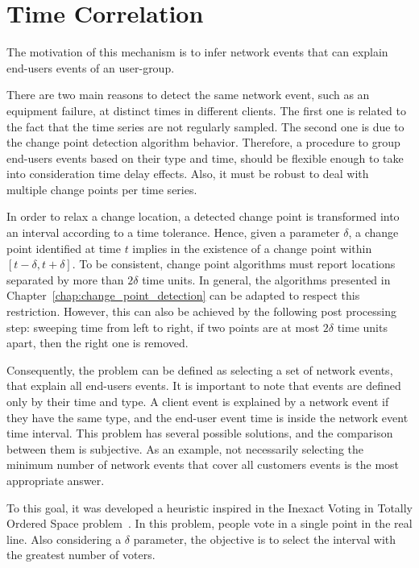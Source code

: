\section{Time Correlation}
\label{sec:time_correlation}

The motivation of this mechanism is to infer network events that can explain
end-users events of an user-group.

There are two main reasons to detect the same network event, such as an
equipment failure, at distinct times in different clients. The first one is
related to the fact that the time series are not regularly sampled. The second
one is due to the change point detection algorithm behavior.
Therefore, a procedure to group end-users events based on their type and time,
should be flexible enough to take into consideration time delay effects. Also,
it must be robust to deal with multiple change points per time series.

In order to relax a change location, a detected change point is
transformed into an interval according to a time tolerance.
Hence, given a parameter $\delta$, a change point identified at
time $t$ implies in the existence of a change point within
$[t - \delta, t + \delta]$. To be consistent,
change point algorithms must report locations separated by more than
$2 \delta$ time units. In general, the algorithms presented in
Chapter~\ref{chap:change_point_detection}
can be adapted to respect this restriction. However, this can also be
achieved by the following post processing step:
sweeping time from left to right, if two
points are at most $2 \delta$ time units apart, then the right one is removed.

Consequently, the problem can be defined as selecting a set of network events,
that explain all end-users events. It is important to note that events are
defined only by their time and type.
A client event is explained by a network event if they have the same type,
and the end-user event time is inside the network event time interval.
This problem has several possible solutions, and the comparison between
them is subjective. As an example, not
necessarily selecting the minimum number of network events that cover all
customers events is the most appropriate answer.

To this goal, it was developed a heuristic inspired in the Inexact Voting in
Totally
Ordered Space problem~\cite{voting_algorithms}. In this problem, people
vote in a single point in the real line. Also considering a $\delta$
parameter, the objective is to
select the interval with the greatest number of voters.

